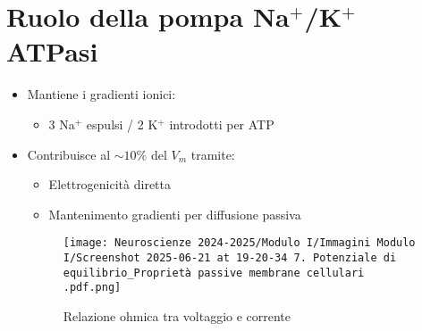 \documentclass{article}
\begin{document}
\section{Ruolo della pompa Na\(^+\)/K\(^+\) ATPasi}
\begin{itemize}
\item Mantiene i gradienti ionici:
\begin{itemize}
\item 3 Na\(^+\) espulsi / 2 K\(^+\) introdotti per ATP
\end{itemize}

\item Contribuisce al \(\sim 10\%\) del \(V_m\) tramite:
\begin{itemize}
\item Elettrogenicità diretta
\item Mantenimento gradienti per diffusione passiva
\end{itemize}

\begin{figure}[h]
\centering
\texttt{[image: Neuroscienze 2024-2025/Modulo I/Immagini Modulo I/Screenshot 2025-06-21 at 19-20-34 7. Potenziale di equilibrio\_Proprietà passive membrane cellulari .pdf.png]}
\caption{Relazione ohmica tra voltaggio e corrente}
\label{fig:pompa}
\end{figure}
\end{itemize}
\end{document}
